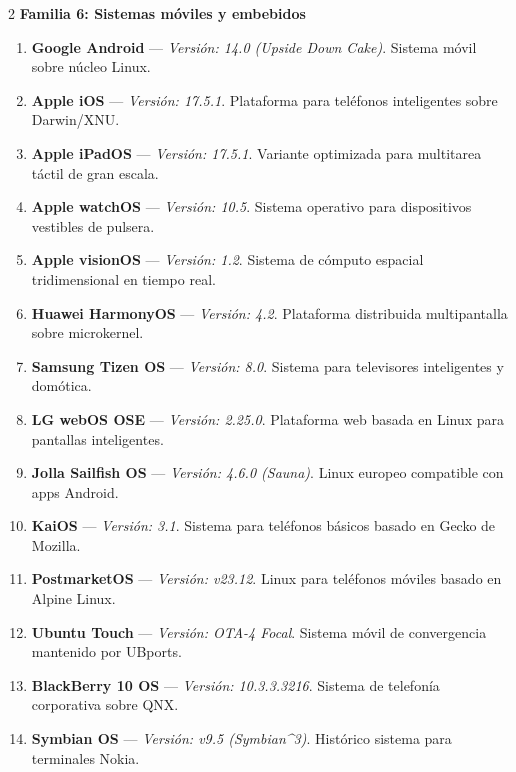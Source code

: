 \documentclass[12pt]{article}
\begin{document}
\begin{multicols}{2}
\medskip
\noindent\textbf{Familia 6: Sistemas móviles y embebidos}\par\smallskip
\begin{enumerate}[label=\textbf{\arabic*.}, leftmargin=*, noitemsep, topsep=1pt, start=81]
    \item \textbf{Google Android} --- \textit{Versión: 14.0 (Upside Down Cake)}. Sistema móvil sobre núcleo Linux.
    \item \textbf{Apple iOS} --- \textit{Versión: 17.5.1}. Plataforma para teléfonos inteligentes sobre Darwin/XNU.
    \item \textbf{Apple iPadOS} --- \textit{Versión: 17.5.1}. Variante optimizada para multitarea táctil de gran escala.
    \item \textbf{Apple watchOS} --- \textit{Versión: 10.5}. Sistema operativo para dispositivos vestibles de pulsera.
    \item \textbf{Apple visionOS} --- \textit{Versión: 1.2}. Sistema de cómputo espacial tridimensional en tiempo real.
    \item \textbf{Huawei HarmonyOS} --- \textit{Versión: 4.2}. Plataforma distribuida multipantalla sobre microkernel.
    \item \textbf{Samsung Tizen OS} --- \textit{Versión: 8.0}. Sistema para televisores inteligentes y domótica.
    \item \textbf{LG webOS OSE} --- \textit{Versión: 2.25.0}. Plataforma web basada en Linux para pantallas inteligentes.
    \item \textbf{Jolla Sailfish OS} --- \textit{Versión: 4.6.0 (Sauna)}. Linux europeo compatible con apps Android.
    \item \textbf{KaiOS} --- \textit{Versión: 3.1}. Sistema para teléfonos básicos basado en Gecko de Mozilla.
    \item \textbf{PostmarketOS} --- \textit{Versión: v23.12}. Linux para teléfonos móviles basado en Alpine Linux.
    \item \textbf{Ubuntu Touch} --- \textit{Versión: OTA-4 Focal}. Sistema móvil de convergencia mantenido por UBports.
    \item \textbf{BlackBerry 10 OS} --- \textit{Versión: 10.3.3.3216}. Sistema de telefonía corporativa sobre QNX.
    \item \textbf{Symbian OS} --- \textit{Versión: v9.5 (Symbian\textasciicircum 3)}. Histórico sistema para terminales Nokia.
\end{enumerate}


\end{multicols}
\end{document}
